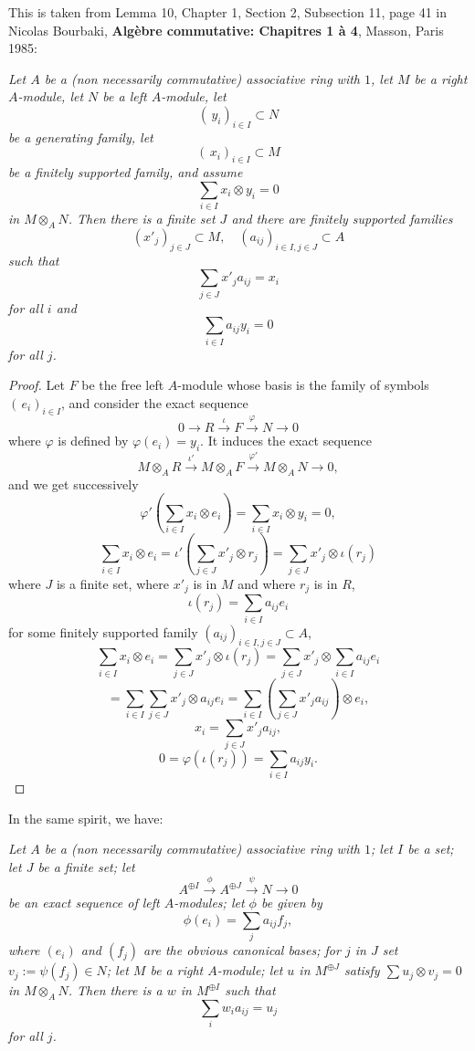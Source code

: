 \documentclass[parskip=half,fontsize=12pt]{scrartcl}%
\begin{document}
This is taken from Lemma 10, Chapter 1, Section 2, Subsection 11, page 41 in Nicolas Bourbaki, \textbf{Algèbre commutative: Chapitres 1 à 4}, Masson, Paris 1985:

\emph{Let $A$ be a (non necessarily commutative) associative ring with $1$, let $M$ be a right $A$-module, let $N$ be a left $A$-module, let 
$$
(\,y_i)_{i\in I}\subset N
$$ 
be a generating family, let 
$$
(\,x_i)_{i\in I}\subset M
$$ 
be a finitely supported family, and assume 
$$
\sum_{i\in I}x_i\otimes y_i=0
$$ 
in $M\otimes_AN$. Then there is a finite set $J$ and there are finitely supported families 
$$
(x'_j)_{j\in J}\subset M,\quad(a_{ij})_{i\in I,j\in J}\subset A
$$ 
such that 
$$
\sum_{j\in J} x'_ja_{ij}=x_i
$$ 
for all $i$ and 
$$
\sum_{i\in I}a_{ij}y_i=0
$$ 
for all $j$.}

\begin{proof} 
Let $F$ be the free left $A$-module whose basis is the family of symbols $(\,e_i)_{i\in I}$, and consider the exact sequence 
$$
0\to R\xrightarrow\iota F\xrightarrow\varphi N\to 0
$$ 
where $\varphi$ is defined by $\varphi(e_i)=y_i$. It induces the exact sequence 
$$
M\otimes_AR\xrightarrow{\iota'}M\otimes_AF\xrightarrow{\varphi'}M\otimes_AN\to 0,
$$ 
and we get successively
$$
\varphi'\left(\sum_{i\in I}x_i\otimes e_i\right)=\sum_{i\in I}x_i\otimes y_i=0,
$$ 
$$
\sum_{i\in I}x_i\otimes e_i=\iota'\left(\sum_{j\in J}x'_j\otimes r_j\right)=\sum_{j\in J}x'_j\otimes\iota(r_j)
$$ 
where $J$ is a finite set, where $x'_j$ is in $M$ and where $r_j$ is in $R$, 
$$
\iota(r_j)=\sum_{i\in I}a_{ij}e_i
$$ 
for some finitely supported family $(a_{ij})_{i\in I,j\in J}\subset A$, 
$$
\sum_{i\in I}x_i\otimes e_i=\sum_{j\in J}x'_j\otimes\iota(r_j)=\sum_{j\in J} x'_j\otimes\sum_{i\in I}a_{ij}e_i
$$
$$
=\sum_{i\in I}\sum_{j\in J} x'_j\otimes a_{ij}e_i=\sum_{i\in I}\left(\sum_{j\in J}x'_ja_{ij}\right)\otimes e_i,
$$ 
$$
x_i=\sum_{j\in J}x'_ja_{ij},
$$ 
$$
0=\varphi(\iota(r_j))=\sum_{i\in I}a_{ij}y_i.
$$ 
\end{proof}

In the same spirit, we have:

\emph{Let $A$ be a (non necessarily commutative) associative ring with $1$; let $I$ be a set; let $J$ be a finite set; let 
$$
A^{\oplus I}\xrightarrow\phi A^{\oplus J}\xrightarrow\psi N\to0
$$ 
be an exact sequence of left $A$-modules; let $\phi$ be given by 
$$
\phi(e_i)=\sum_ja_{ij}f_j,
$$ 
where $(e_i)$ and $(f_j)$ are the obvious canonical bases; for $j$ in $J$ set $v_j:=\psi(f_j)\in N$; let $M$ be a right $A$-module; let $u$ in $M^{\oplus J}$ satisfy $\sum u_j\otimes v_j=0$ in $M\otimes_AN$. Then there is a $w$ in $M^{\oplus I}$ such that 
$$
\sum_iw_ia_{ij}=u_j
$$ 
for all $j$.}
\end{document}
